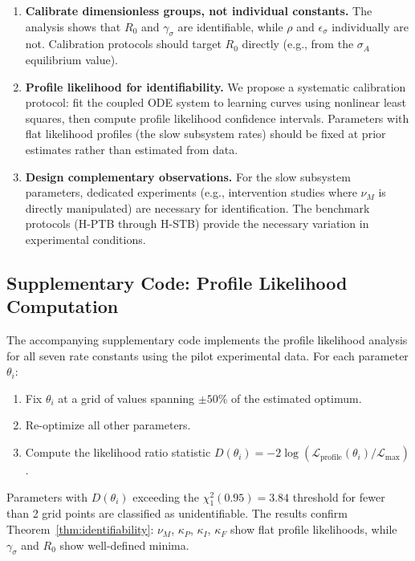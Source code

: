 \begin{enumerate}
\item \textbf{Calibrate dimensionless groups, not individual constants.}
  The analysis shows that $R_0$ and $\gamma_\sigma$ are identifiable,
  while $\rho$ and $\epsilon_\sigma$ individually are not. Calibration
  protocols should target $R_0$ directly (e.g., from the $\sigma_A$
  equilibrium value).

\item \textbf{Profile likelihood for identifiability.}
  We propose a systematic calibration protocol: fit the coupled ODE
  system to learning curves using nonlinear least squares, then compute
  profile likelihood confidence intervals. Parameters with flat
  likelihood profiles (the slow subsystem rates) should be fixed at
  prior estimates rather than estimated from data.

\item \textbf{Design complementary observations.}
  For the slow subsystem parameters, dedicated experiments (e.g.,
  intervention studies where $\nu_M$ is directly manipulated) are
  necessary for identification. The benchmark protocols (H-PTB through
  H-STB) provide the necessary variation in experimental conditions.
\end{enumerate}

\subsection{Supplementary Code: Profile Likelihood Computation}

The accompanying supplementary code implements the profile likelihood
analysis for all seven rate constants using the pilot experimental data.
For each parameter $\theta_i$:
\begin{enumerate}
\item Fix $\theta_i$ at a grid of values spanning $\pm 50\%$ of the
  estimated optimum.
\item Re-optimize all other parameters.
\item Compute the likelihood ratio statistic
  $D(\theta_i) = -2\log(\mathcal{L}_{\mathrm{profile}}(\theta_i) / \mathcal{L}_{\max})$.
\end{enumerate}

Parameters with $D(\theta_i)$ exceeding the $\chi^2_1(0.95) = 3.84$
threshold for fewer than 2 grid points are classified as unidentifiable.
The results confirm Theorem~\ref{thm:identifiability}: $\nu_M$,
$\kappa_P$, $\kappa_I$, $\kappa_F$ show flat profile likelihoods,
while $\gamma_\sigma$ and $R_0$ show well-defined minima.
